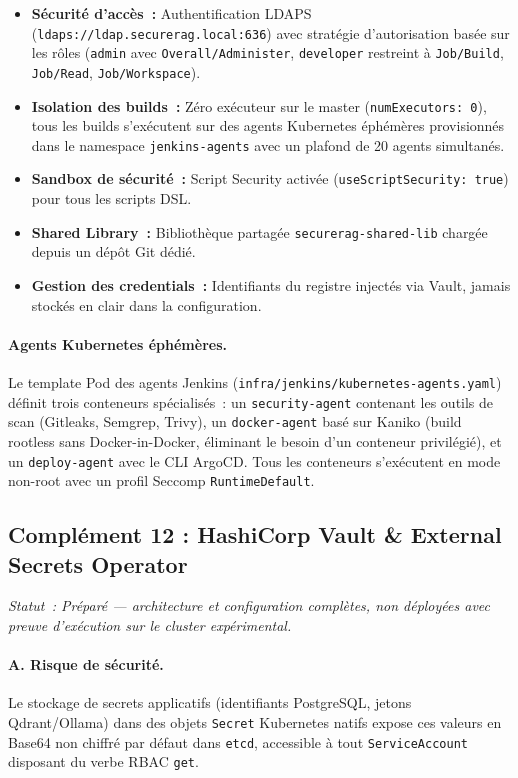 \begin{itemize}
    \item \textbf{Sécurité d'accès~:} Authentification LDAPS (\texttt{ldaps://ldap.securerag.local:636}) avec stratégie d'autorisation basée sur les rôles (\texttt{admin} avec \texttt{Overall/Administer}, \texttt{developer} restreint à \texttt{Job/Build}, \texttt{Job/Read}, \texttt{Job/Workspace}).
    \item \textbf{Isolation des builds~:} Zéro exécuteur sur le master (\texttt{numExecutors: 0}), tous les builds s'exécutent sur des agents Kubernetes éphémères provisionnés dans le namespace \texttt{jenkins-agents} avec un plafond de 20 agents simultanés.
    \item \textbf{Sandbox de sécurité~:} Script Security activée (\texttt{useScriptSecurity: true}) pour tous les scripts DSL.
    \item \textbf{Shared Library~:} Bibliothèque partagée \texttt{securerag-shared-lib} chargée depuis un dépôt Git dédié.
    \item \textbf{Gestion des credentials~:} Identifiants du registre injectés via Vault, jamais stockés en clair dans la configuration.
\end{itemize}

\paragraph{Agents Kubernetes éphémères.}
Le template Pod des agents Jenkins (\texttt{infra/jenkins/kubernetes-agents.yaml}) définit trois conteneurs spécialisés~: un \texttt{security-agent} contenant les outils de scan (Gitleaks, Semgrep, Trivy), un \texttt{docker-agent} basé sur Kaniko (build rootless sans Docker-in-Docker, éliminant le besoin d'un conteneur privilégié), et un \texttt{deploy-agent} avec le CLI ArgoCD. Tous les conteneurs s'exécutent en mode non-root avec un profil Seccomp \texttt{RuntimeDefault}.


\subsection{Complément 12 : HashiCorp Vault \& External Secrets Operator}
\label{subsec:comp_vault_eso}
\textit{Statut~: Préparé — architecture et configuration complètes, non déployées avec preuve d'exécution sur le cluster expérimental.}

\paragraph{A. Risque de sécurité.}
Le stockage de secrets applicatifs (identifiants PostgreSQL, jetons Qdrant/Ollama) dans des objets \texttt{Secret} Kubernetes natifs expose ces valeurs en Base64 non chiffré par défaut dans \texttt{etcd}, accessible à tout \texttt{ServiceAccount} disposant du verbe RBAC \texttt{get}.

